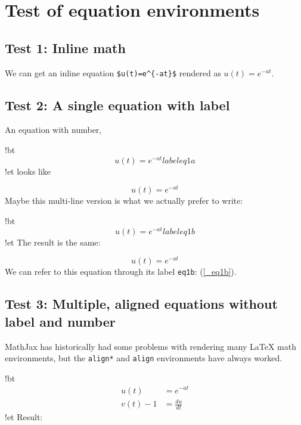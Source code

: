 \documentclass[%
oneside,                 %
final,                   %
10pt]{article}
\begin{document}
\section{Test of equation environments}

\subsection{Test 1: Inline math}

We can get an inline equation
\Verb!$u(t)=e^{-at}$! rendered as $u(t)=e^{-at}$.

\subsection{Test 2: A single equation with label}

An equation with number,

\blatexcod
!bt
\begin{equation} u(t)=e^{-at} label{eq1a}\end{equation}
!et
\elatexcod
looks like

\begin{equation} u(t)=e^{-at} \label{_eq1a}\end{equation}
Maybe this multi-line version is what we actually prefer to write:

\blatexcod
!bt
\begin{equation}
u(t)=e^{-at}
label{eq1b}
\end{equation}
!et
\elatexcod
The result is the same:

\begin{equation}
u(t)=e^{-at} \label{_eq1b}
\end{equation}
We can refer to this equation through its label \texttt{eq1b}: (\ref{_eq1b}).

\subsection{Test 3: Multiple, aligned equations without label and number}

MathJax has historically had some problems with rendering many {\LaTeX}
math environments, but the \texttt{align*} and \texttt{align} environments have
always worked.

\blatexcod
!bt
\begin{align*}
u(t)&=e^{-at}\\ 
v(t) - 1 &= \frac{du}{dt}
\end{align*}
!et
\elatexcod
Result:
\end{document}
